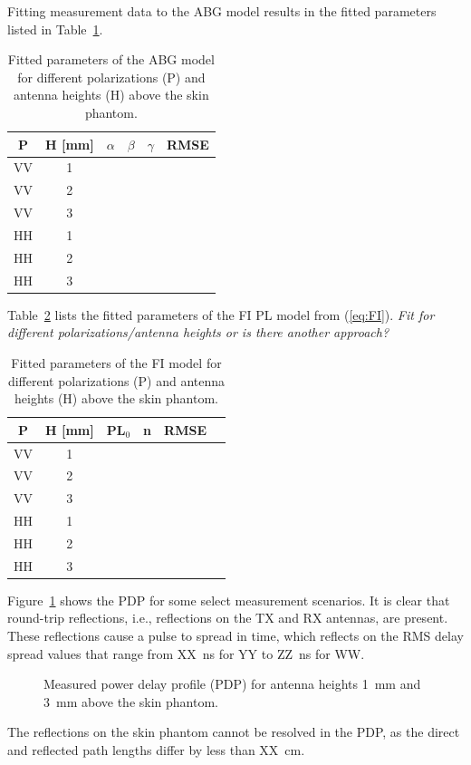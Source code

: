 \documentclass[preprint]{rsl}
\begin{document}
Fitting measurement data to the ABG model results in the fitted parameters listed in Table~\ref{table:ABG}. 
\begin{table}
  \caption{Fitted parameters of the ABG model for different polarizations (P) and antenna heights (H) above the skin phantom.}
  \label{table:ABG}
  \begin{center}
    \begin{tabular}{cc|cccc}
      P & H [mm] & $\alpha$ & $\beta$ & $\gamma$ & RMSE \\
      \hline
      VV & 1 \\
      VV & 2\\
      VV & 3\\
      HH & 1\\
      HH & 2\\
      HH & 3\\
    \end{tabular}
  \end{center}
\end{table}
Table~\ref{table:FI} lists the fitted parameters of the FI PL model from (\ref{eq:FI}). \emph{Fit for different polarizations/antenna heights or is there another approach?}
\begin{table}
  \caption{Fitted parameters of the FI model for different polarizations (P) and antenna heights (H) above the skin phantom.}
  \label{table:FI}
  \begin{center}
    \begin{tabular}{cc|cccc}
      P & H [mm] & PL$_0$ & n& RMSE \\
      \hline
      VV & 1 \\
      VV & 2\\
      VV & 3\\
      HH & 1\\
      HH & 2\\
      HH & 3\\
    \end{tabular}
  \end{center}
\end{table}

Figure~\ref{fig:PDP} shows the PDP for some select measurement scenarios. 
It is clear that round-trip reflections, i.e., reflections on the TX and RX antennas, are present. 
These reflections cause a pulse to spread in time, which reflects on the RMS delay spread values that range from XX~ns for YY to ZZ~ns for WW.
\begin{figure}[tb]
\begin{center}
\caption{Measured power delay profile (PDP) for antenna heights 1~mm and 3~mm above the skin phantom.}
\label{fig:PDP}
\end{center}
\end{figure}
The reflections on the skin phantom cannot be resolved in the PDP, as the direct and reflected path lengths differ by less than XX~cm.
\end{document}
